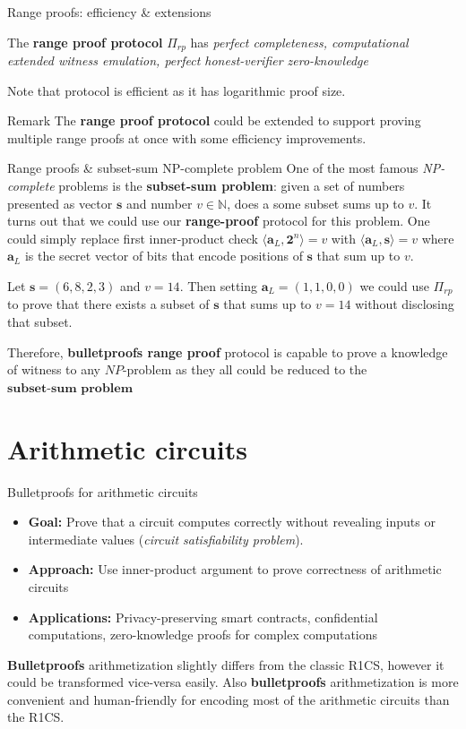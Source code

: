\documentclass{zkdl-presentation-template}
\begin{document}
\begin{frame}{Range proofs: efficiency \& extensions}
    \begin{theorem}
        The \textbf{range proof protocol} $\Pi_{rp}$ has \textit{perfect completeness, computational extended witness emulation, perfect honest-verifier zero-knowledge}
        \label{th:range_proof}
    \end{theorem}
    Note that protocol is efficient as it has logarithmic proof size. 
    \begin{block}{Remark}
        The \textbf{range proof protocol} could be extended to support proving multiple range proofs at once with some efficiency improvements.
    \end{block}
\end{frame}
\begin{frame}{Range proofs \& subset-sum NP-complete problem}
    One of the most famous \textit{NP-complete} problems is the \textbf{subset-sum problem}: given a set of numbers presented as vector $\mathbf{s}$ and number $v \in \mathbb{N}$, does a some subset sums up to $v$. It turns out that we could use our \textbf{range-proof} protocol for this problem. One could simply replace first inner-product check $\langle \mathbf{a}_L, \mathbf{2}^n \rangle = v$ with $\langle \mathbf{a}_L, \mathbf{s} \rangle = v$ where $\mathbf{a}_L$ is the secret vector of bits that encode positions of $\mathbf{s}$ that sum up to $v$.
    \begin{example}
        Let $\mathbf{s} = (6,8,2,3)$ and $v = 14$. Then setting $\mathbf{a}_L = (1,1,0,0)$ we could use $\Pi_{rp}$ to prove that there exists a subset of $\mathbf{s}$ that sums up to $v=14$ without disclosing that subset.
    \end{example}
    Therefore, \textbf{bulletproofs range proof} protocol is capable to prove a knowledge of witness to any $NP$-problem as they all could be reduced to the $\textbf{subset-sum problem}$
\end{frame}
\section{Arithmetic circuits}

\begin{frame}{Bulletproofs for arithmetic circuits}
    \begin{itemize}
        \item \textbf{Goal:} Prove that a circuit computes correctly without revealing inputs or intermediate values (\textit{circuit satisfiability problem}).
        \item \textbf{Approach:} Use inner-product argument to prove correctness of arithmetic circuits
        \item \textbf{Applications:} Privacy-preserving smart contracts, confidential computations, zero-knowledge proofs for complex computations
    \end{itemize}
    \textbf{Bulletproofs} arithmetization slightly differs from the classic R1CS, however it could be transformed vice-versa easily. Also \textbf{bulletproofs} arithmetization is more convenient and human-friendly for encoding most of the arithmetic circuits than the R1CS.
\end{frame}
\end{document}
